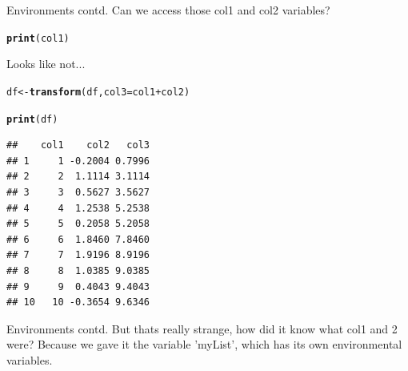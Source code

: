 \documentclass{beamer}\usepackage[]{graphicx}\usepackage[]{color}
\makeatletter
\newcommand{\hlopt}[1]{\textcolor[rgb]{0,0,0}{#1}}%
\newcommand{\hlstd}[1]{\textcolor[rgb]{0.345,0.345,0.345}{#1}}%
\newcommand{\hlkwb}[1]{\textcolor[rgb]{0.69,0.353,0.396}{#1}}%
\newcommand{\hlkwc}[1]{\textcolor[rgb]{0.333,0.667,0.333}{#1}}%
\newcommand{\hlkwd}[1]{\textcolor[rgb]{0.737,0.353,0.396}{\textbf{#1}}}%
\newenvironment{kframe}{%
 \def\at@end@of@kframe{}%
 \ifinner\ifhmode%
  \def\at@end@of@kframe{\end{minipage}}%
  \begin{minipage}{\columnwidth}%
 \fi\fi%
 \def\FrameCommand##1{\hskip\@totalleftmargin \hskip-\fboxsep
 \colorbox{shadecolor}{##1}\hskip-\fboxsep
     \hskip-\linewidth \hskip-\@totalleftmargin \hskip\columnwidth}%
 \MakeFramed {\advance\hsize-\width
   \@totalleftmargin\z@ \linewidth\hsize
   \@setminipage}}%
 {\par\unskip\endMakeFramed%
 \at@end@of@kframe}
\newenvironment{knitrout}{}{} %
\makeatother
\begin{document}
\begin{frame}[fragile]{Environments contd.}
Can we access those col1 and col2 variables?
\begin{knitrout}
\color{fgcolor}\begin{kframe}
\begin{alltt}
\hlkwd{print}\hlstd{(col1)}
\end{alltt}


{\ttfamily\noindent\bfseries\color{errorcolor}{\#\# Error: object 'col1' not found}}\end{kframe}
\end{knitrout}

Looks like not... 
\begin{knitrout}
\color{fgcolor}\begin{kframe}
\begin{alltt}
\hlstd{df} \hlkwb{<-} \hlkwd{transform}\hlstd{(df,} \hlkwc{col3} \hlstd{= col1} \hlopt{+} \hlstd{col2)}

\hlkwd{print}\hlstd{(df)}
\end{alltt}
\begin{verbatim}
##    col1    col2   col3
## 1     1 -0.2004 0.7996
## 2     2  1.1114 3.1114
## 3     3  0.5627 3.5627
## 4     4  1.2538 5.2538
## 5     5  0.2058 5.2058
## 6     6  1.8460 7.8460
## 7     7  1.9196 8.9196
## 8     8  1.0385 9.0385
## 9     9  0.4043 9.4043
## 10   10 -0.3654 9.6346
\end{verbatim}
\end{kframe}
\end{knitrout}

\end{frame}

\begin{frame}[fragile]{Environments contd.}
But thats really strange, how did it know what col1 and 2 were?
\linebreak
\linebreak
\pause
Because we gave it the variable 'myList', which has its own environmental variables.
\end{frame}
\end{document}
